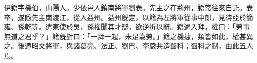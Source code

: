 \begin{pinyinscope}
 
 
 伊籍字機伯，山陽人。少依邑人鎮南將軍劉表。先主之在荊州，籍常往來自託。表卒，遂隨先主南渡江，從入益州。益州旣定，以籍為左將軍從事中郎，見待亞於簡雍、孫乾等。遣東使於吳，孫權聞其才辯，欲逆折以辭。籍適入拜，權曰：「勞事無道之君乎？」籍旣對曰：「一拜一起，未足為勞。」籍之機捷，類皆如此，權甚異之。後遷昭文將軍，與諸葛亮、法正、劉巴、李嚴共造蜀科；蜀科之制，由此五人焉。
 
 
\end{pinyinscope}